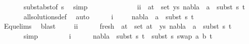 \begin{isabellebody}
\ \ \ \ \ \isamarkupfalse%
\ subst{\isacharunderscore}{\kern0pt}abst{\isacharbrackleft}{\kern0pt}of\ s{}{\isacharbrackright}{\kern0pt}\ \isamarkupfalse%
\ simp\isanewline
\ \ \ \isanewline
\ \ \ \isamarkupfalse%
\ {}\isanewline
\ \ \ \isamarkupfalse%
\ ii{\isacharcolon}{\kern0pt}\ {\isachardoublequoteopen}{\isasymforall}\ {\isacharparenleft}{\kern0pt}a{\isacharcomma}{\kern0pt}t{\isacharparenright}{\kern0pt}\ {\isasymin}\ set\ ys{\isachardot}{\kern0pt}\ nabla{}\ {\isasymturnstile}\ a\ {\isasymsharp}\ subst\ s{}\ t{\isachardoublequoteclose}\isanewline
\ \ \ \ \ \isamarkupfalse%
\ all{\isacharunderscore}{\kern0pt}solutions{\isacharunderscore}{\kern0pt}def\ \isamarkupfalse%
\ auto\isanewline
\ \ \ \isamarkupfalse%
\ {}\ i\isanewline
\ \ \ \isamarkupfalse%
\ {\isachardoublequoteopen}nabla{}\ {\isasymturnstile}\ a\ {\isasymsharp}\ subst\ s{}\ t{}{\isachardoublequoteclose}\isanewline
\ \ \ \ \ \isamarkupfalse%
\ Equ{\isacharunderscore}{\kern0pt}elims{\isacharparenleft}{\kern0pt}{}{\isacharparenright}{\kern0pt}\ \isamarkupfalse%
\ blast\isanewline
\ \ \ \isamarkupfalse%
\ ii\ \isanewline
\ \ \ \isamarkupfalse%
\ fresh{\isacharcolon}{\kern0pt}\ {\isachardoublequoteopen}{\isasymforall}\ {\isacharparenleft}{\kern0pt}a{\isacharcomma}{\kern0pt}t{\isacharparenright}{\kern0pt}\ {\isasymin}\ set\ {\isacharparenleft}{\kern0pt}{\isacharparenleft}{\kern0pt}a{\isacharcomma}{\kern0pt}t{}{\isacharparenright}{\kern0pt}\ {\isacharhash}{\kern0pt}\ ys{\isacharparenright}{\kern0pt}{\isachardot}{\kern0pt}\ nabla{}\ {\isasymturnstile}\ a\ {\isasymsharp}\ subst\ s{}\ t{\isachardoublequoteclose}\isanewline
\ \ \ \ \ \isamarkupfalse%
\ simp\isanewline
\ \ \ \isanewline
\ \ \ \isamarkupfalse%
\ i\ {}\isanewline
\ \ \ \isamarkupfalse%
\ {\isachardoublequoteopen}nabla{}\ {\isasymturnstile}\ subst\ s{}\ t{}\ {\isasymapprox}\ subst\ s{}\ {\isacharparenleft}{\kern0pt}swap\ {\isacharbrackleft}{\kern0pt}{\isacharparenleft}{\kern0pt}a{\isacharcomma}{\kern0pt}\ b{\isacharparenright}{\kern0pt}{\isacharbrackright}{\kern0pt}\ t{}{\isacharparenright}{\kern0pt}{\isachardoublequoteclose}\ \isanewline

\end{isabellebody}
